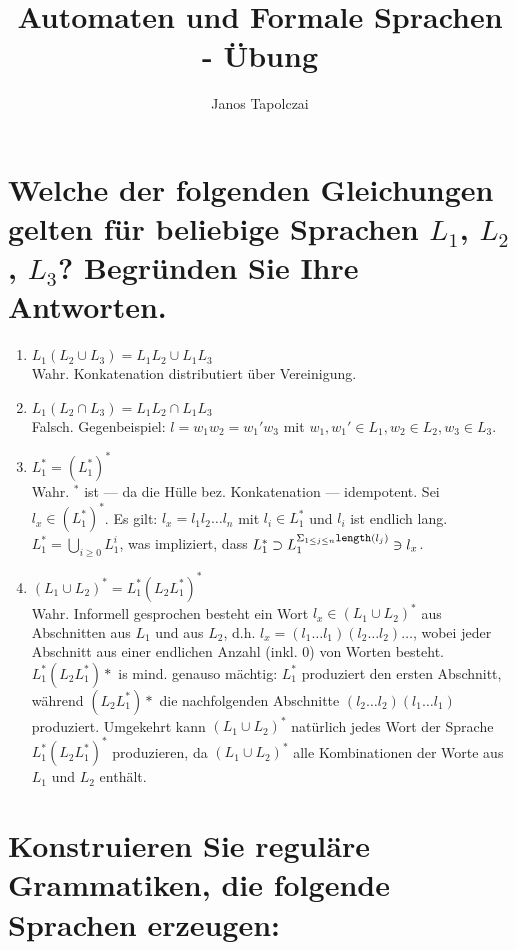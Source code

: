 \documentclass[]{scrartcl}
\title{Automaten und Formale Sprachen - Übung}
\author{Janos Tapolczai}
\begin{document}
\maketitle


\section{Welche der folgenden Gleichungen gelten für beliebige Sprachen $L_1$, $L_2$, $L_3$? Begründen Sie Ihre Antworten.}

\begin{enumerate}
	\item $L_1(L_2 \cup L_3) = L_1L_2 \cup L_1L_3$\\
		Wahr. Konkatenation distributiert über Vereinigung. 
	\item $L_1(L_2 \cap L_3) = L_1L_2 \cap L_1L_3$\\
		Falsch. Gegenbeispiel: $l = w_1w_2 = w_1'w_3$ mit $w_1,w_1' \in L_1, w_2 \in L_2, w_3 \in L_3$.
	\item $L_1^* = (L_1^*)^*$\\
		Wahr. $^*$ ist --- da die Hülle bez. Konkatenation --- idempotent. Sei $l_x \in (L_1^*)^*$. Es gilt: $l_x = l_1l_2\dots l_n$ mit $l_i \in L_1^*$ und $l_i$ ist endlich lang. $L_1^* = \bigcup_{i \geq 0} L_1^i$, was impliziert, dass $L_1^* \supset L_1^{\Sigma_{1 \leq j \leq n} \texttt{\footnotesize length}(l_j)} \ni l_x$.
	\item $(L_1 \cup L_2)^* = L_1^*(L_2L_1^*)^*$\\
		Wahr.
		Informell gesprochen besteht ein Wort $l_x \in (L_1 \cup L_2)^*$ aus Abschnitten aus $L_1$ und aus $L_2$, d.h. $l_x=(l_1\dots l_1)(l_2\dots l_2)\dots$, wobei jeder Abschnitt aus einer endlichen Anzahl (inkl. 0) von Worten besteht. $L_1^*(L_2L_1^*)*$ is mind. genauso mächtig: $L_1^*$ produziert den ersten Abschnitt, während $(L_2L_1^*)*$ die nachfolgenden Abschnitte $(l_2\dots l_2)(l_1\dots l_1)$ produziert. Umgekehrt kann $(L_1 \cup L_2)^*$ natürlich jedes Wort der Sprache $L_1^*(L_2L_1^*)^*$ produzieren, da $(L_1 \cup L_2)^*$ alle Kombinationen der Worte aus $L_1$ und $L_2$ enthält.
\end{enumerate}

\setcounter{section}{1}

\section{Konstruieren Sie reguläre Grammatiken, die folgende Sprachen erzeugen:}
\end{document}
